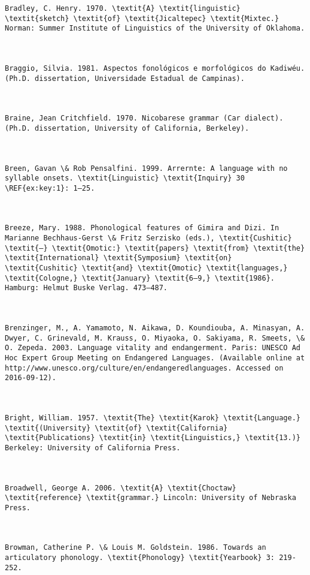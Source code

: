 \begin{verbatim}
Bradley, C. Henry. 1970. \textit{A} \textit{linguistic} \textit{sketch} \textit{of} \textit{Jicaltepec} \textit{Mixtec.} Norman: Summer Institute of Linguistics of the University of Oklahoma.



Braggio, Silvia. 1981. Aspectos fonológicos e morfológicos do Kadiwéu. (Ph.D. dissertation, Universidade Estadual de Campinas).



Braine, Jean Critchfield. 1970. Nicobarese grammar (Car dialect). (Ph.D. dissertation, University of California, Berkeley).



Breen, Gavan \& Rob Pensalfini. 1999. Arrernte: A language with no syllable onsets. \textit{Linguistic} \textit{Inquiry} 30 \REF{ex:key:1}: 1–25.



Breeze, Mary. 1988. Phonological features of Gimira and Dizi. In Marianne Bechhaus-Gerst \& Fritz Serzisko (eds.), \textit{Cushitic} \textit{–} \textit{Omotic:} \textit{papers} \textit{from} \textit{the} \textit{International} \textit{Symposium} \textit{on} \textit{Cushitic} \textit{and} \textit{Omotic} \textit{languages,} \textit{Cologne,} \textit{January} \textit{6–9,} \textit{1986}. Hamburg: Helmut Buske Verlag. 473–487.



Brenzinger, M., A. Yamamoto, N. Aikawa, D. Koundiouba, A. Minasyan, A. Dwyer, C. Grinevald, M. Krauss, O. Miyaoka, O. Sakiyama, R. Smeets, \& O. Zepeda. 2003. Language vitality and endangerment. Paris: UNESCO Ad Hoc Expert Group Meeting on Endangered Languages. (Available online at http://www.unesco.org/culture/en/endangeredlanguages. Accessed on 2016-09-12).



Bright, William. 1957. \textit{The} \textit{Karok} \textit{Language.} \textit{(University} \textit{of} \textit{California} \textit{Publications} \textit{in} \textit{Linguistics,} \textit{13.)} Berkeley: University of California Press.



Broadwell, George A. 2006. \textit{A} \textit{Choctaw} \textit{reference} \textit{grammar.} Lincoln: University of Nebraska Press.



Browman, Catherine P. \& Louis M. Goldstein. 1986. Towards an articulatory phonology. \textit{Phonology} \textit{Yearbook} 3: 219-252.




\end{verbatim}
